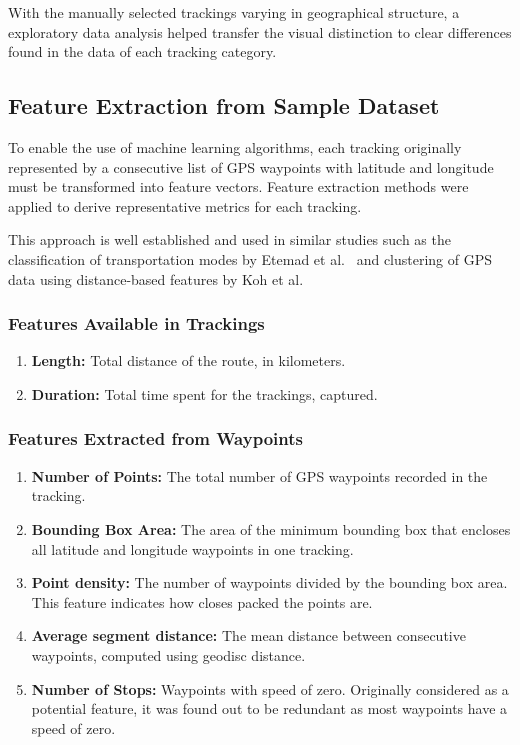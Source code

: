 \documentclass[a4paper,12pt,twoside]{scrreprt}
\begin{document}
With the manually selected trackings varying in geographical structure, a
exploratory data
analysis helped transfer the visual distinction to clear differences found in
the data of each tracking category.

\subsection{Feature Extraction from Sample Dataset}
To enable the use of machine learning algorithms, each tracking originally
represented by a consecutive list of GPS waypoints with latitude and longitude
must be transformed into feature vectors. Feature extraction methods were
applied to derive representative metrics for each tracking.

This approach is well established and used in similar studies such as the
classification
of transportation modes by Etemad et al.~\cite{etemad_predicting_2018} and
clustering of GPS data using distance-based features by Koh et
al.~\cite{koh_clustering_2022}

\subsubsection{Features Available in Trackings}

\begin{enumerate}
  \item \textbf{Length:} Total distance of the route, in kilometers.
  \item \textbf{Duration:} Total time spent for the trackings, captured.
\end{enumerate}

\subsubsection{Features Extracted from Waypoints}

\begin{enumerate}
  \item \textbf{Number of Points:} The total number of GPS waypoints recorded
        in the tracking.
  \item \textbf{Bounding Box Area:} The area of the minimum bounding box that
        encloses all latitude and longitude waypoints in one tracking.
  \item \textbf{Point density:} The number of waypoints divided by the bounding
        box area. This feature indicates how closes packed the points are.
  \item \textbf{Average segment distance:} The mean distance between
        consecutive waypoints, computed using geodisc distance.
  \item \textbf{Number of Stops:} Waypoints with speed of zero. Originally
        considered as a potential feature, it was found out to be redundant as
        most
        waypoints have a speed of zero.
\end{enumerate}
\end{document}
